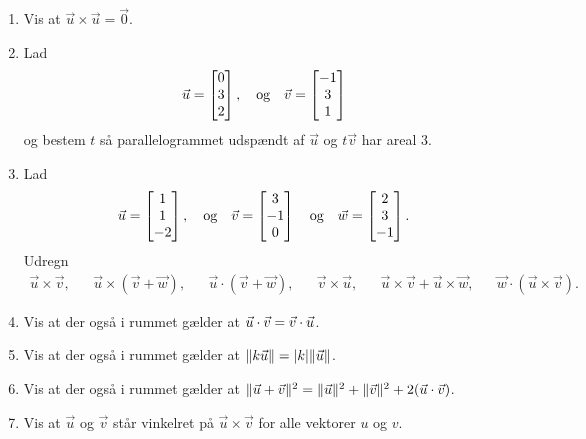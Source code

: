 \begin{enumerate}
	\item Vis at $\vec{u}\times \vec{u}=\vec{0}$.
	
	\item Lad
		\begin{align*}
	\vec{u}=\begin{bmatrix}
	0\\3\\2
	\end{bmatrix},\quad \textup{og}\quad \vec{v}=\begin{bmatrix}
	-1\\3\\1
	\end{bmatrix}
	\end{align*}
	og bestem $t$ så parallelogrammet udspændt af $\vec{u}$ og $t\vec{v}$ har areal $3$.

	\item Lad
	\begin{align*}
	\vec{u}=\begin{bmatrix}
	1\\1\\-2
	\end{bmatrix},\quad \textup{og}\quad \vec{v}=\begin{bmatrix}
	3\\-1\\0
	\end{bmatrix}
	\quad \textup{og}\quad \vec{w}=\begin{bmatrix}
	2\\3\\-1
	\end{bmatrix}.
	\end{align*}
	Udregn
	\begin{align*}
	\vec{u}\times \vec{v},&& \vec{u}\times(\vec{v}+\vec{w}),&& \vec{u}\cdot (\vec{v}+\vec{w}),&& \vec{v}\times \vec{u},&& \vec{u}\times \vec{v}+\vec{u}\times \vec{w},&& \vec{w}\cdot (\vec{u}\times \vec{v}).
	\end{align*}
	
	\item Vis at der også i rummet gælder at $\vec{u}\cdot \vec{v}=\vec{v}\cdot \vec{u}$. 
	
	\item Vis at der også i rummet gælder at $\Vert k\vec{u}\Vert=\vert k\vert\Vert \vec{u}\Vert$.
	
	\item Vis at der også i rummet gælder at $\Vert \vec{u}+\vec{v}\Vert^2=\Vert \vec{u}\Vert^2+\Vert \vec{v}\Vert^2+2(\vec{u}\cdot \vec{v})$.
	
	\item Vis at $\vec{u}$ og $\vec{v}$ står vinkelret på $\vec{u}\times \vec{v}$ for alle vektorer $u$ og $v$.
	
\end{enumerate}